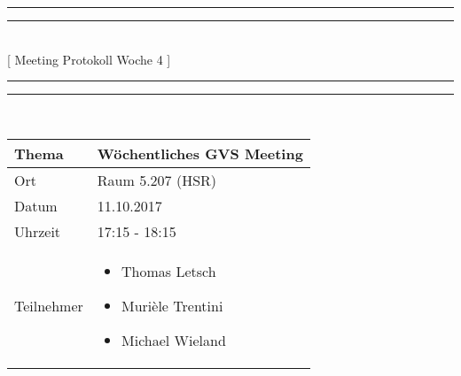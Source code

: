 \documentclass[11pt, a4paper,oneside]{scrartcl}
\begin{document}
\centering
\rule{\textwidth}{1.6pt}\vspace*{-\baselineskip}\vspace*{2pt} %
\rule{\textwidth}{0.4pt}\\[\baselineskip] %
{\LARGE [ Meeting Protokoll Woche 4 ]}\\[0.2\baselineskip] %
\rule{\textwidth}{0.4pt}\vspace*{-\baselineskip}\vspace{3.2pt} %
\rule{\textwidth}{1.6pt}\\[2\baselineskip] %

\begin{tabu} to \linewidth {l X }
	\toprule
	\textbf{Thema} & \textbf{Wöchentliches GVS Meeting} \\
	\midrule
	Ort & Raum 5.207 (HSR) \\
	Datum & 11.10.2017 \\
	Uhrzeit & 17:15 - 18:15 \\
	Teilnehmer & 
	\begin{minipage}[t]{\textwidth}
	  	\begin{itemize}
	  		\item Thomas Letsch
			\item Murièle Trentini
			\item Michael Wieland
	  	\end{itemize}
	\end{minipage}
	\\
	\bottomrule
\end{tabu}
\end{document}
